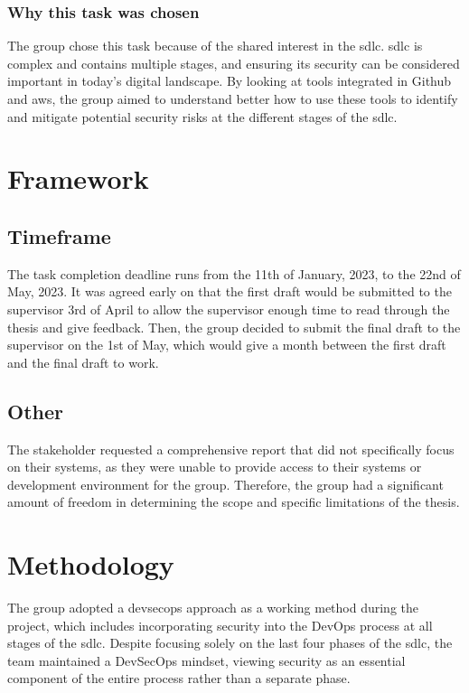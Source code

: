 \subsubsection{Why this task was chosen}
The group chose this task because of the shared interest in the \acrlong{sdlc}. \acrshort{sdlc} is complex and contains multiple stages, and ensuring its security can be considered important in today's digital landscape. By looking at tools integrated in Github and \acrshort{aws}, the group aimed to understand better how to use these tools to identify and mitigate potential security risks at the different stages of the \acrshort{sdlc}.

\newpage
\section{Framework}

\subsection{Timeframe}
The task completion deadline runs from the 11th of January, 2023, to the 22nd of May, 2023. It was agreed early on that the first draft would be submitted to the supervisor 3rd of April to allow the supervisor enough time to read through the thesis and give feedback. Then, the group decided to submit the final draft to the supervisor on the 1st of May, which would give a month between the first draft and the final draft to work.    


\subsection{Other}
The stakeholder requested a comprehensive report that did not specifically focus on their systems, as they were unable to provide access to their systems or development environment for the group. Therefore, the group had a significant amount of freedom in determining the scope and specific limitations of the thesis. 

\section{Methodology}
The group adopted a \acrshort{devsecops} approach as a working method during the project, which includes incorporating security into the DevOps process at all stages of the \acrshort{sdlc}. Despite focusing solely on the last four phases of the \acrshort{sdlc}, the team maintained a DevSecOps mindset, viewing security as an essential component of the entire process rather than a separate phase. 


